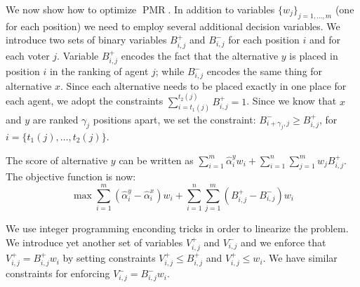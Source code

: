 \documentclass[12pt]{article}
\DeclareMathOperator{\PMR}{PMR}
\begin{document}
We now show how to optimize $\PMR$.
In addition to variables $\{ w_{j} \}_{j=1,\ldots,m}$ (one for each position) we need to employ several additional decision variables.
We introduce two sets of binary variables $B^{+}_{i,j}$ and $B^{-}_{i,j}$  for each position $i$ and for each voter $j$.
Variable $B_{i,j}^{+}$ encodes the fact that the alternative $y$ is placed in position $i$ in the ranking of agent $j$; while  $B_{i,j}^{-}$ encodes the same thing for alternative $x$.
Since each alternative needs to be placed exactly in one place for each agent, we adopt the constraints
$\sum_{i=t_{1}(j)}^{t_{2}(j)} B_{i,j}^{+} = 1$.
Since we know that $x$ and $y$ are ranked $\gamma_{j}$ positions apart, we set the constraint:
$B_{i+\gamma_{j},j}^{-} \geq B_{i,j}^{+}$,  for $i = \{ t_{1}(j), \ldots, t_{2}(j)\}$.


The score of alternative $y$ can be written as $\sum_{i = 1}^{m} \hat{\alpha}_{i}^{y}  w_{i} + \sum_{i=1}^{n} \sum_{j=1}^{m} w_{j} B_{i,j}^{+}$.
The objective function is now:
 \[ \max \sum_{i = 1}^{m} (\hat{\alpha}_{i}^{y} - \hat{\alpha}_{i}^{x}) w_{i} +  \sum_{i=1}^{n} \sum_{j=1}^{m} (B_{i,j}^{+} - B_{i,j}^{-})  w_i \]

We use integer programming enconding tricks in order to linearize the problem.
We introduce yet another set of variables  $V_{i,j}^{+} $  and $V_{i,j}^{-}$ %
and we enforce that $V_{i,j}^{+} = B^{+}_{i,j} w_i$ by setting constraints $V_{i,j}^{+} \leq B^{+}_{i,j}$ and $V_{i,j}^{+}  \leq w_i$.
We have similar constraints for enforcing $V_{i,j}^{-} = B^{-}_{i,j} w_i$.
\end{document}
